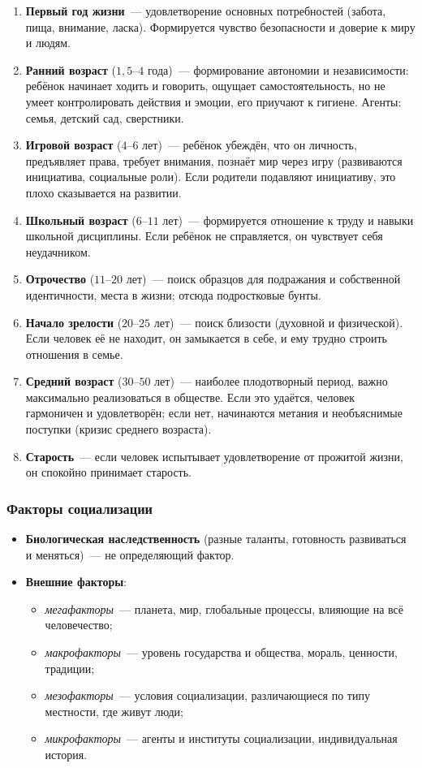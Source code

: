 \documentclass[12pt]{article}
\begin{document}
	\begin{enumerate}
		\item \textbf{Первый год жизни}~--- удовлетворение основных потребностей (забота, пища, внимание, ласка). Формируется чувство безопасности и доверие к миру и людям.
		\item \textbf{Ранний возраст} ($1{,}5$--$4$ года)~--- формирование автономии и независимости: ребёнок начинает ходить и говорить, ощущает самостоятельность, но не умеет контролировать действия и эмоции, его приучают к гигиене. Агенты: семья, детский сад, сверстники.
		\item \textbf{Игровой возраст} ($4$--$6$ лет)~--- ребёнок убеждён, что он личность, предъявляет права, требует внимания, познаёт мир через игру (развиваются инициатива, социальные роли). Если родители подавляют инициативу, это плохо сказывается на развитии.
		\item \textbf{Школьный возраст} ($6$--$11$ лет)~--- формируется отношение к труду и навыки школьной дисциплины. Если ребёнок не справляется, он чувствует себя неудачником.
		\item \textbf{Отрочество} ($11$--$20$ лет)~--- поиск образцов для подражания и собственной идентичности, места в жизни; отсюда подростковые бунты.
		\item \textbf{Начало зрелости} ($20$--$25$ лет)~--- поиск близости (духовной и физической). Если человек её не находит, он замыкается в себе, и ему трудно строить отношения в семье.
		\item \textbf{Средний возраст} ($30$--$50$ лет)~--- наиболее плодотворный период, важно максимально реализоваться в обществе. Если это удаётся, человек гармоничен и удовлетворён; если нет, начинаются метания и необъяснимые поступки (кризис среднего возраста).
		\item \textbf{Старость}~--- если человек испытывает удовлетворение от прожитой жизни, он спокойно принимает старость.
	\end{enumerate}

	\subsubsection{Факторы социализации}

	\begin{itemize}
		\item \textbf{Биологическая наследственность} (разные таланты, готовность развиваться и меняться)~--- не определяющий фактор.
		\item \textbf{Внешние факторы}:
		\begin{itemize}
			\item \textit{мегафакторы}~--- планета, мир, глобальные процессы, влияющие на всё человечество;
			\item \textit{макрофакторы}~--- уровень государства и общества, мораль, ценности, традиции;
			\item \textit{мезофакторы}~--- условия социализации, различающиеся по типу местности, где живут люди;
			\item \textit{микрофакторы}~--- агенты и институты социализации, индивидуальная история.
		\end{itemize}
	\end{itemize}
\end{document}
